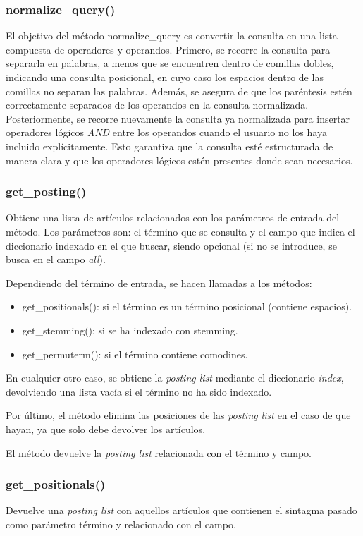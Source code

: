 \documentclass[12pt,a4paper]{article}
\begin{document}
\subsubsection{normalize\_query()}
El objetivo del método normalize\_query es convertir la consulta en una lista compuesta de operadores y operandos. Primero, se recorre la consulta para separarla en palabras, a menos que se encuentren dentro de comillas dobles, indicando una consulta posicional, en cuyo caso los espacios dentro de las comillas no separan las palabras. Además, se asegura de que los paréntesis estén correctamente separados de los operandos en la consulta normalizada. Posteriormente, se recorre nuevamente la consulta ya normalizada para insertar operadores lógicos \textit{AND} entre los operandos cuando el usuario no los haya incluido explícitamente. Esto garantiza que la consulta esté estructurada de manera clara y que los operadores lógicos estén presentes donde sean necesarios.

\subsubsection{get\_posting()}
Obtiene una lista de artículos relacionados con los parámetros de entrada del método.
Los parámetros son: el término que se consulta y el campo que indica el diccionario indexado en el que buscar, siendo opcional (si no se introduce, se busca en el campo \textit{all}).

Dependiendo del término de entrada, se hacen llamadas a los métodos:
\begin{itemize}
    \item get\_positionals(): si el término es un término posicional (contiene espacios).
    \item get\_stemming(): si se ha indexado con stemming.
    \item get\_permuterm(): si el término contiene comodines.
\end{itemize}

En cualquier otro caso, se obtiene la \textit{posting list} mediante el diccionario \textit{index}, devolviendo una lista vacía si el término no ha sido indexado.

Por último, el método elimina las posiciones de las \textit{posting list} en el caso de que hayan, ya que solo debe devolver los artículos.

El método devuelve la \textit{posting list} relacionada con el término y campo.

\subsubsection{get\_positionals()}
Devuelve una \textit{posting list} con aquellos artículos que contienen el sintagma pasado como parámetro término y relacionado con el campo.
\end{document}
